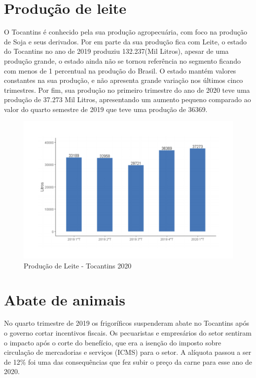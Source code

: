 \section{Produção de leite}
\par O Tocantins é conhecido pela sua produção agropecuária, com foco na produção de Soja e seus derivados. Por em parte da sua produção fica com Leite, o estado do Tocantins no ano de 2019 produziu 132.237(Mil Litros), apesar de uma produção grande, o estado ainda não se tornou referência no segmento ficando com menos de 1 percentual na produção do Brasil. O estado mantém valores constantes na sua produção, e não apresenta grande variação nos últimos cinco trimestres. Por fim, sua produção no primeiro trimestre do ano de 2020 teve uma produção de 37.273 Mil Litros, apresentando um aumento pequeno comparado ao valor do quarto semestre de 2019 que teve uma produção de 36369. 
\\
\begin{figure}[h]
	\caption{Produção de Leite - Tocantins 2020}
	\includegraphics[width=\linewidth]{fig/Produção de leite.pdf}
\end{figure}

\section{Abate de animais}

\par No quarto trimestre de 2019 os frigoríficos suspenderam abate no Tocantins após o governo cortar incentivos fiscais. Os pecuaristas e empresários do setor sentiram o impacto após o corte do benefício, que era a isenção do imposto sobre circulação de mercadorias e serviços (ICMS) para o setor. A alíquota passou a ser de 12\% foi uma das consequências que fez subir o preço da carne para esse ano de 2020.


